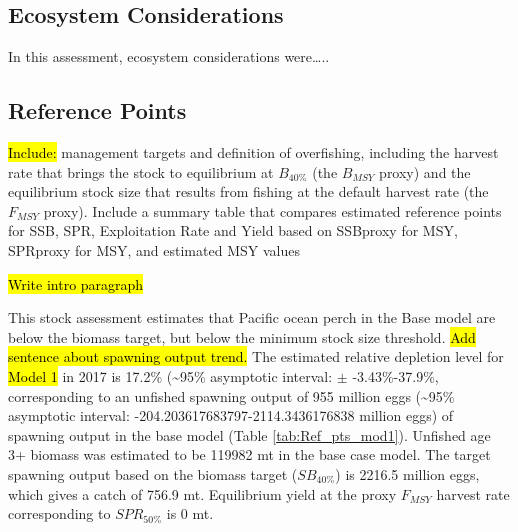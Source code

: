 \documentclass[12pt,]{article}
\begin{document}
\FloatBarrier

\subsection*{Ecosystem Considerations}\label{ecosystem-considerations}

In this assessment, ecosystem considerations were\ldots{}..

\subsection*{Reference Points}\label{reference-points}

\hl{Include:} management targets and definition of overfishing,
including the harvest rate that brings the stock to equilibrium at
\(B_{40\%}\) (the \(B_{MSY}\) proxy) and the equilibrium stock size that
results from fishing at the default harvest rate (the \(F_{MSY}\)
proxy). Include a summary table that compares estimated reference points
for SSB, SPR, Exploitation Rate and Yield based on SSBproxy for MSY,
SPRproxy for MSY, and estimated MSY values

\hl{Write intro paragraph}

This stock assessment estimates that Pacific ocean perch in the Base
model are below the biomass target, but below the minimum stock size
threshold. \hl{Add sentence about spawning output trend.} The estimated
relative depletion level for \hl{Model 1} in 2017 is 17.2\%
(\textasciitilde{}95\% asymptotic interval: \(\pm\) -3.43\%-37.9\%,
corresponding to an unfished spawning output of 955 million eggs
(\textasciitilde{}95\% asymptotic interval:
-204.203617683797-2114.3436176838 million eggs) of spawning output in
the base model (Table \ref{tab:Ref_pts_mod1}). Unfished age 3+ biomass
was estimated to be 119982 mt in the base case model. The target
spawning output based on the biomass target (\(SB_{40\%}\)) is 2216.5
million eggs, which gives a catch of 756.9 mt. Equilibrium yield at the
proxy \(F_{MSY}\) harvest rate corresponding to \(SPR_{50\%}\) is 0 mt.

\FloatBarrier
\end{document}
